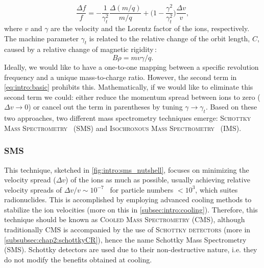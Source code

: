 \begin{equation}
    \frac{\Delta{f}}{f}=-\frac{1}{\gamma_t^2}\frac{\Delta(m/q)}{m/q}+\Bigg(1-\frac{\gamma^2}{\gamma_t^2}\Bigg)\frac{\Delta v}{v},
    \label{eq:intro:basic}
\end{equation}
where $v$ and $\gamma$ are the velocity and the Lorentz factor of the ions, respectively. The machine parameter $\gamma_t$ is related to the relative change of the orbit length, $C$, caused by a relative change of magnetic rigidity\,\cite{Steck-2020}:
\begin{equation}
    B\rho=mv\gamma/q.
    \label{eq:intro:brho}
\end{equation}
Ideally, we would like to have a one-to-one mapping between a specific revolution frequency and a unique mass-to-charge ratio. However, the second term in \cref{eq:intro:basic} prohibits this. Mathematically, if we would like to eliminate this second term we could: either reduce the momentum spread between ions to zero ($\Delta v \rightarrow 0$) or cancel out the term in parentheses by tuning $\gamma \rightarrow \gamma_t$. Based on these two approaches, two different mass spectrometry techniques emerge: \textsc{Schottky Mass Spectrometry}~\cite{sms1} (\textsc{SMS}) and \textsc{Isochronous Mass Spectrometry}~\cite{iso1} (\textsc{IMS}).

\subsubsection{\textsc{SMS}}

This technique, sketched in \cref{fig:intro:sms_nutshell}, focuses on minimizing the velocity spread ($\Delta v$) of the ions as much as possible, usually achieving relative velocity spreads of $\Delta v / v \sim 10^{-7}$~\cite{radonSMS} for particle numbers $<10^{3}$, which suites radionuclides. This is accomplished by employing advanced cooling methods to stabilize the ion velocities (more on this in \cref{subsec:intro:cooling}). Therefore, this technique should be known as \textsc{Cooled Mass Spectrometry} (\textsc{CMS}), although traditionally \textsc{CMS} is accompanied by the use of \textsc{Schottky detectors} (more in \cref{subsubsec:chap2:schottkyCR}), hence the name Schottky Mass Spectrometry (\textsc{SMS}). Schottky detectors are used due to their non-destructive nature, i.e. they do not modify the benefits obtained at cooling.



